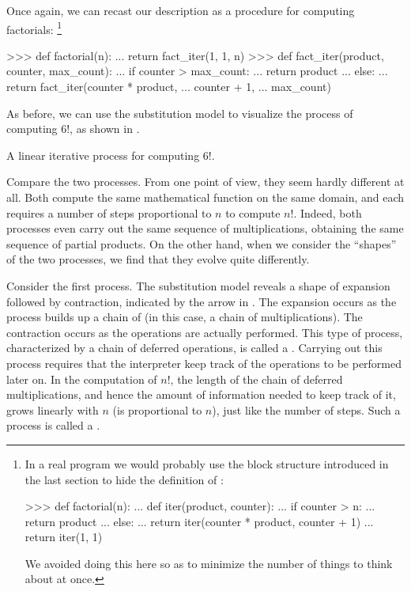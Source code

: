 Once again, we can recast our description as a procedure for computing
factorials:%
\footnote{%
In a real program we would probably use the block
structure introduced in the last section to hide the definition of
:

\begin{compactCodeBlock}
>>> def factorial(n):
...     def iter(product, counter):
...         if counter > n:
...             return product
...         else:
...             return iter(counter * product, counter + 1)
...     return iter(1, 1)
\end{compactCodeBlock}

We avoided doing this here so as to minimize the number of things to think
about at once.%
}

\begin{codeBlock}
>>> def factorial(n):
...     return fact_iter(1, 1, n)
>>> def fact_iter(product, counter, max_count):
...     if counter > max_count:
...         return product
...     else:
...         return fact_iter(counter * product,
...                          counter + 1,
...                          max_count)
\end{codeBlock}

\noindent
As before, we can use the substitution model to visualize the process of
computing 6!, as shown in .

\begin{imageFigure}{A linear iterative process for computing 6!.}
  
\end{imageFigure}

Compare the two processes.  From one point of view, they seem hardly different
at all.  Both compute the same mathematical function on the same domain, and
each requires a number of steps proportional to \( n \) to compute \( n! \).
Indeed, both processes even carry out the same sequence of multiplications,
obtaining the same sequence of partial products.  On the other hand, when we
consider the ``shapes'' of the two processes, we find that they evolve quite
differently.

Consider the first process. The substitution model reveals a shape of
expansion followed by contraction, indicated by the arrow in \mbox{}.
The expansion occurs as the process builds up a chain of  (in this case, a chain of multiplications).  The contraction occurs
as the operations are actually performed.  This type of process, characterized
by a chain of deferred operations, is called a .
Carrying out this process requires that the interpreter keep track of the
operations to be performed later on.  In the computation of \( n! \), the length
of the chain of deferred multiplications, and hence the amount of information
needed to keep track of it, grows linearly with \( n \) (is proportional to
\( n \)), just like the number of steps.  Such a process is called a
.

